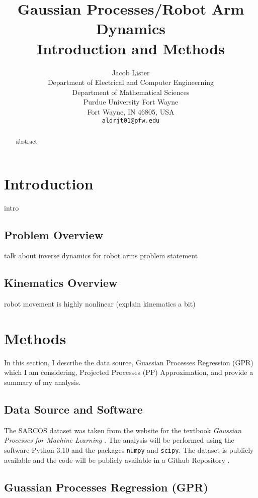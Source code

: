 \documentclass{article}
\title{Gaussian Processes/Robot Arm Dynamics \\ Introduction and Methods}
\author {Jacob Lister                              \\
Department of Electrical and Computer Engineerning \\
Department of Mathematical Sciences                \\
Purdue University Fort Wayne                       \\
Fort Wayne, IN 46805, USA                          \\
\texttt{aldrjt01@pfw.edu}
}
\begin{document}
    \maketitle

    \begin{abstract}
        abstract
    \end{abstract}

    \section{Introduction}

    intro
    
    \subsection{Problem Overview}
    
    talk about inverse dynamics for robot arms problem statement
    
    \subsection{Kinematics Overview}
    
    robot movement is highly nonlinear (explain kinematics a bit)
    
    \section{Methods}
    
    In this section, I describe the data source, Guassian Processes Regression (GPR) which I am
    considering, Projected Processes (PP) Approximation, and provide a summary of my analysis.
    
    \subsection{Data Source and Software}
    
    The SARCOS dataset was taken from the website for the textbook 
    \textit{Gaussian Processes for Machine Learning} \citet{sarcos}. The analysis will be performed
    using the software Python 3.10 and the packages \texttt{numpy} and \texttt{scipy}. The dataset
    is publicly available and the code will be publicly available in a Github Repository
    \citep{github}.
    
    \subsection{Guassian Processes Regression (GPR)}
    
\end{document}
